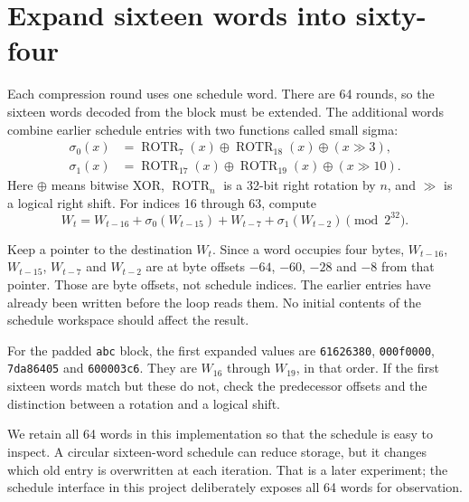 \section{Expand sixteen words into sixty-four}
Each compression round uses one schedule word. There are 64 rounds, so the sixteen
words decoded from the block must be extended. The additional words combine earlier
schedule entries with two functions called small sigma:
\[
  \begin{aligned}
    \sigma_0(x) & =\operatorname{ROTR}_7(x)\mathbin{\oplus}
    \operatorname{ROTR}_{18}(x)\mathbin{\oplus}(x\mathbin{\gg}3), \\
    \sigma_1(x) & =\operatorname{ROTR}_{17}(x)\mathbin{\oplus}
    \operatorname{ROTR}_{19}(x)\mathbin{\oplus}(x\mathbin{\gg}10).
  \end{aligned}
\]
Here \(\oplus\) means bitwise XOR, \(\operatorname{ROTR}_n\) is a 32-bit right
rotation by \(n\), and \(\gg\) is a logical right shift. For indices 16 through 63,
compute
\[
  W_t=W_{t-16}+\sigma_0(W_{t-15})+W_{t-7}+\sigma_1(W_{t-2})
  \pmod{2^{32}}.
\]

Keep a pointer to the destination \(W_t\). Since a word occupies four bytes,
\(W_{t-16}\), \(W_{t-15}\), \(W_{t-7}\) and \(W_{t-2}\) are at byte offsets
\(-64\), \(-60\), \(-28\) and \(-8\) from that pointer. Those are byte offsets,
not schedule indices. The earlier entries have already been written before the loop
reads them. No initial contents of the schedule workspace should affect the result.

For the padded \texttt{abc} block, the first expanded values are
\texttt{61626380}, \texttt{000f0000}, \texttt{7da86405} and \texttt{600003c6}.
They are \(W_{16}\) through \(W_{19}\), in that order. If the first sixteen words
match but these do not, check the predecessor offsets and the distinction between a
rotation and a logical shift.

We retain all 64 words in this implementation so that the schedule is easy to inspect.
A circular sixteen-word schedule can reduce storage, but it changes which old entry is
overwritten at each iteration. That is a later experiment; the schedule interface in
this project deliberately exposes all 64 words for observation.
